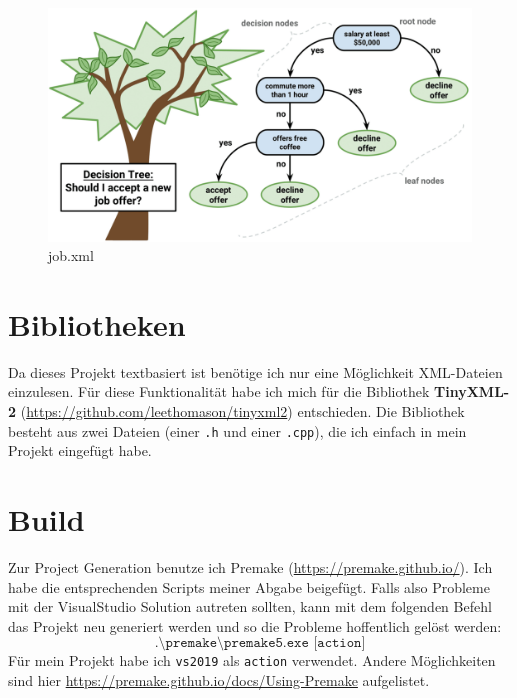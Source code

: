 \documentclass[a4paper,12pt]{article}
\begin{document}
\begin{figure}[h]
	\centering
	\includegraphics[width=\linewidth]{job.png}
	\caption{job.xml}
\end{figure}


\section*{Bibliotheken}

Da dieses Projekt textbasiert ist benötige ich nur eine Möglichkeit XML-Dateien einzulesen. Für diese Funktionalität habe ich mich für die Bibliothek \textbf{TinyXML-2} (\url{https://github.com/leethomason/tinyxml2}) entschieden.
Die Bibliothek besteht aus zwei Dateien (einer \texttt{.h} und einer \texttt{.cpp}), die ich einfach in mein Projekt eingefügt habe.

\section*{Build}

Zur Project Generation benutze ich Premake (\url{https://premake.github.io/}). Ich habe die entsprechenden Scripts meiner Abgabe beigefügt.
Falls also Probleme mit der VisualStudio Solution autreten sollten,
kann mit dem folgenden Befehl das Projekt neu generiert werden und so die Probleme hoffentlich gelöst werden:
\[\texttt{.\textbackslash premake\textbackslash premake5.exe [action]}\]
Für mein Projekt habe ich \texttt{vs2019} als \texttt{action} verwendet. Andere Möglichkeiten sind hier \url{https://premake.github.io/docs/Using-Premake} aufgelistet.
\end{document}
